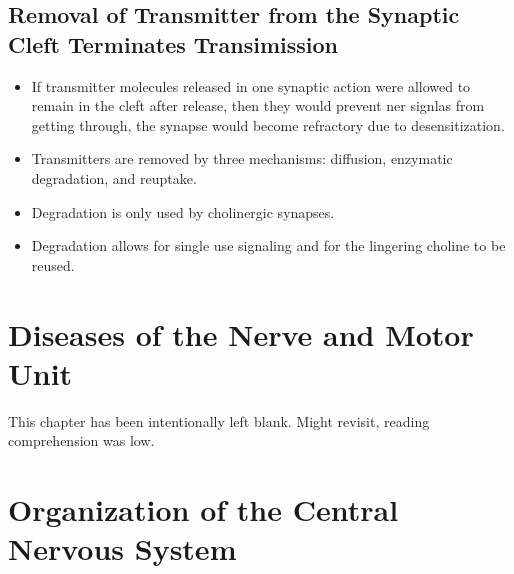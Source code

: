 \documentclass[12pt,a4paper]{article}
\begin{document}
\subsection{Removal of Transmitter from the Synaptic Cleft Terminates Transimission}
\begin{itemize}
    \item If transmitter molecules released in one synaptic action were allowed to remain in the cleft after release, then they would prevent ner signlas from getting through, the synapse would become refractory due to desensitization.
    \item Transmitters are removed by three mechanisms: diffusion, enzymatic degradation, and reuptake.
    \item Degradation is only used by cholinergic synapses.
    \item Degradation allows for single use signaling and for the lingering choline to be reused.
\end{itemize}

\clearpage
\section{Diseases of the Nerve and Motor Unit}
    This chapter has been intentionally left blank. Might revisit, reading comprehension was low.


\clearpage
{}
\clearpage
\section{Organization of the Central Nervous System}
\end{document}
